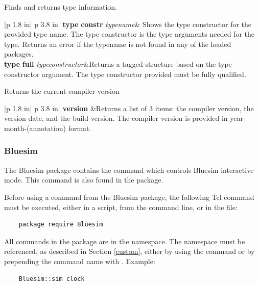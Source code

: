 
 Finds and returns type information.

\begin{tabular}{|p {1.8 in}| p {3.8 in}|}
\hline
\hline
{\bf type} {\bf  constr} {\em typename}& Shows the type constructor for
the provided type name. The type constructor is the type arguments
needed for the type. Returns an error if the typename is not found in
any of the loaded packages. \\ 
\hline
{\bf type} {\bf full} {\em typeconstructor}&Returns a tagged structure
based on the type constructor argument. The type constructor provided
must be fully qualified. \\
\hline
\hline
\end{tabular}



Returns the current compiler version

\begin{tabular}{|p {1.8 in}| p {3.8 in}|}
\hline
\hline
{\bf version} &Returns a list of 3 items: the compiler version, the
version date, and the build  version. The compiler version is
provided  in year-month-(annotation) format. \\
\hline
\hline
\end{tabular}


\subsubsection{Bluesim}

The Bluesim package contains the  command which controls
Bluesim interactive mode.  This command is also found in the
 package.

Before using a command from the Bluesim package,  the
following Tcl command must  be executed, either in a script, 
from the command line, or in the  file:
\begin{verbatim}
    package require Bluesim
\end{verbatim}

All commands in the  package are in the  
namespace.  The namespace must be referenced, as described in Section
\ref{custom}, either by using the  command or by
prepending the command name with .  Example:
\begin{verbatim}
    Bluesim::sim clock
\end{verbatim}

